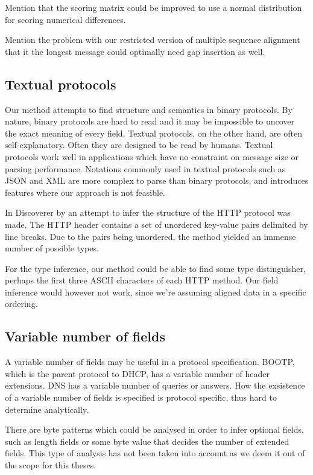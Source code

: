 \documentclass[a4paper]{report}
\begin{document}
Mention that the scoring matrix could be improved to use a normal distribution
for scoring numerical differences.

Mention the problem with our restricted version of multiple sequence alignment
that it the longest message could optimally need gap insertion as well.

\subsection{Textual protocols}
Our method attempts to find structure and semantics in binary protocols.
By nature, binary protocols are hard to read and it may be impossible to
uncover the exact meaning of every field. Textual protocols, on the other
hand, are often self-explanatory. Often they are designed to be read by
humans. Textual protocols work well in applications which have no constraint
on message size or parsing performance. Notations commonly used in textual
protocols such as JSON and XML are more complex to parse than binary protocols,
and introduces features where our approach is not feasible.

In Discoverer by \citeauthor{cui07} an attempt to infer the structure of
the HTTP protocol was made. The HTTP header contains a set of unordered
key-value pairs delimited by line breaks. Due to the pairs being unordered,
the method yielded an immense number of possible types.

For the type inference, our method could be able to find some type 
distinguisher, perhaps the first three ASCII characters of each HTTP method.
Our field inference would however not work, since we're assuming aligned
data in a specific ordering.

\subsection{Variable number of fields}
A variable number of fields may be useful in a protocol specification. BOOTP,
which is the parent protocol to DHCP, has a variable number of header extensions.
DNS has a variable number of queries or answers. How the exsistence of a variable
number of fields is specified is protocol specific, thus hard to determine
analytically. 

There are byte patterns which could be analysed in order to infer optional
fields, such as length fields or some byte value that decides the number of
extended fields. This type of analysis has not been taken into account as we
deem it out of the scope for this theses.
\end{document}
